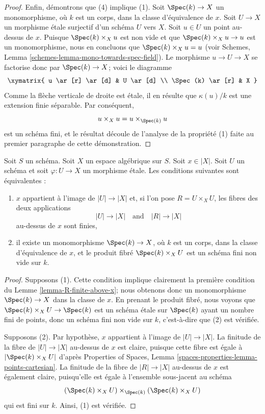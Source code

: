 \begin{proof}
\medskip\noindent
Enfin, démontrons que (4) implique (1). Soit $\Spec(k) \to X$
un monomorphisme, où $k$ est un corps, dans la classe d'équivalence de $x$.
Soit $U \to X$ un morphisme étale surjectif d'un schéma $U$ vers $X$.
Soit $u \in U$ un point au-dessus de $x$. Puisque $\Spec(k) \times_X u$
est non vide et que $\Spec(k) \times_X u \to u$ est un monomorphisme,
nous en concluons que $\Spec(k) \times_X u = u$ (voir
Schemes, Lemma \ref{schemes-lemma-mono-towards-spec-field}).
Le morphisme $u \to U \to X$ se factorise donc par $\Spec(k) \to X$; voici
le diagramme
$$
\xymatrix{
u \ar[r] \ar[d] & U \ar[d] \\
\Spec(k) \ar[r] & X
}
$$
Comme la flèche verticale de droite est étale, il en résulte que
$\kappa(u)/k$ est une extension finie séparable. Par conséquent,
$$
u \times_X u = u \times_{\Spec(k)} u
$$
est un schéma fini, et le résultat découle de l'analyse de la propriété (1)
faite au premier paragraphe de cette démonstration.
\end{proof}

\begin{lemma}
\label{lemma-weak-UR-finite-above-x}
Soit $S$ un schéma. Soit $X$ un espace algébrique sur $S$.
Soit $x \in |X|$.
Soit $U$ un schéma et soit $\varphi : U \to X$ un morphisme étale.
Les conditions suivantes sont équivalentes :
\begin{enumerate}
\item $x$ appartient à l'image de $|U| \to |X|$ et, si l'on pose
$R = U \times_X U$, les fibres des deux applications
$$
|U| \longrightarrow |X|
\quad\text{and}\quad
|R| \longrightarrow |X|
$$
au-dessus de $x$ sont finies,
\item il existe un monomorphisme $\Spec(k) \to X$, où $k$ est un corps,
dans la classe d'équivalence de $x$, et
le produit fibré $\Spec(k) \times_X U$ est
un schéma fini non vide sur $k$.
\end{enumerate}
\end{lemma}

\begin{proof}
Supposons (1). Cette condition implique clairement la première condition du
Lemme \ref{lemma-R-finite-above-x}; nous obtenons donc un monomorphisme
$\Spec(k) \to X$ dans la classe de $x$. En prenant le produit fibré,
nous voyons que $\Spec(k) \times_X U \to \Spec(k)$ est un schéma
étale sur $\Spec(k)$ ayant un nombre fini de points, donc un schéma fini
non vide sur $k$, c'est-à-dire que (2) est vérifiée.

\medskip\noindent
Supposons (2). Par hypothèse, $x$ appartient à l'image de
$|U| \to |X|$. La finitude de la fibre de
$|U| \to |X|$ au-dessus de $x$ est claire, puisque cette fibre est égale à
$|\Spec(k) \times_X U|$ d'après
Properties of Spaces,
Lemma \ref{spaces-properties-lemma-points-cartesian}.
La finitude de la fibre de $|R| \to |X|$ au-dessus de $x$ est également
claire, puisqu'elle est égale à l'ensemble sous-jacent au schéma
$$
(\Spec(k) \times_X U) \times_{\Spec(k)} (\Spec(k) \times_X U)
$$
qui est fini sur $k$. Ainsi, (1) est vérifiée.
\end{proof}

